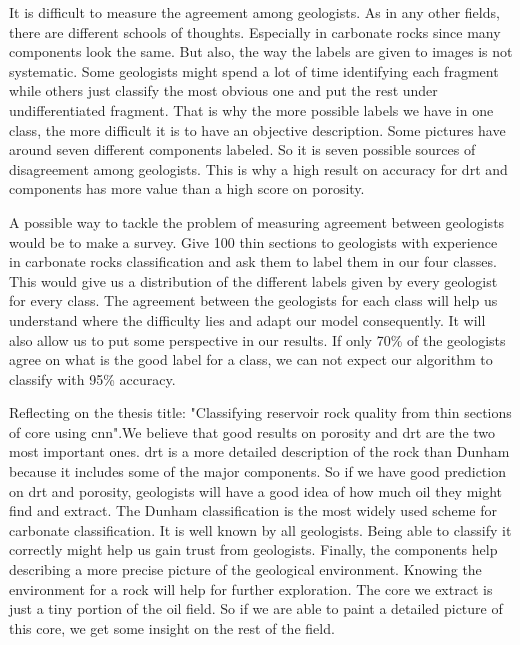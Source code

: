 It is difficult to measure the agreement among geologists. As in any other fields, there are different schools of thoughts. Especially in carbonate rocks since many components look the same. But also, the way the labels are given to images is not systematic. Some geologists might spend a lot of time identifying each fragment while others just classify the most obvious one and put the rest under undifferentiated fragment. That is why the more possible labels we have in one class, the more difficult it is to have an objective description. Some pictures have around seven different components labeled. So it is seven possible sources of disagreement among geologists. This is why a high result on accuracy for \gls{drt} and components has more value than a high score on porosity. 

A possible way to tackle the problem of measuring agreement between geologists would be to make a survey. Give 100 thin sections to geologists with experience in carbonate rocks classification and ask them to label them in our four classes. This would give us a distribution of the different labels given by every geologist for every class. The agreement between the geologists for each class will help us understand where the difficulty lies and adapt our model consequently. It will also allow us to put some perspective in our results. If only 70\% of the geologists agree on what is the good label for a class, we can not expect our algorithm to classify with 95\% accuracy. 

Reflecting on the thesis title: "Classifying reservoir rock quality from thin sections of core using \gls{cnn}".We believe that good results on porosity and \gls{drt} are the two most important ones. \gls{drt} is a more detailed description of the rock than Dunham because it includes some of the major components. So if we have good prediction on \gls{drt} and porosity, geologists will have a good idea of how much oil they might find and extract. The Dunham classification is the most widely used scheme for carbonate classification. It is well known by all geologists. Being able to classify it correctly might help us gain trust from geologists. Finally, the components help describing a more precise picture of the geological environment. Knowing the environment for a rock will help for further exploration. The core we extract is just a tiny portion of the oil field. So if we are able to paint a detailed picture of this core, we get some insight on the rest of the field. 